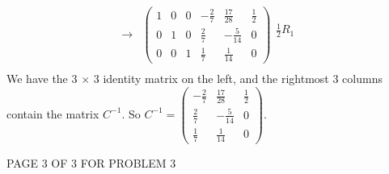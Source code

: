 \documentclass[12pt]{article}
\newenvironment{problem}[2][Problem]
{
	\begin{trivlist} 
		\item[\hskip \labelsep {\bfseries #1 #2:}]
	}
{
	\end{trivlist}
	}
\newenvironment{solution}[1][Solution]
{
	\begin{trivlist} 
		\item[\hskip \labelsep {\itshape #1:}]
	}
	{
	\end{trivlist}
}
\begin{document}
\begin{problem}{5}
\begin{solution}
\begin{align*}
%
\rightarrow & \begin{pmatrix} 1&0&0&-\frac{2}{7}&\frac{17}{28}&\frac{1}{2}\\0&1&0&\frac{2}{7}&-\frac{5}{14}&0\\0&0&1&\frac{1}{7}&\frac{1}{14}&0 \end{pmatrix} \begin{matrix} \frac{1}{2}R_1\text{} \\ \text{} \\ \text{} \end{matrix}\\
\end{align*}
We have the 3 $\times$ 3 identity matrix on the left, and the rightmost 3 columns contain the matrix $C^{-1}$. So $C^{-1} = \begin{pmatrix} -\frac{2}{7}&\frac{17}{28}&\frac{1}{2}\\ \frac{2}{7}&-\frac{5}{14}&0\\ \frac{1}{7}&\frac{1}{14}&0\end{pmatrix}$.
\end{solution}
\vfill
\centerline{PAGE 3 OF 3 FOR PROBLEM 3}
\end{problem}
\end{document}
